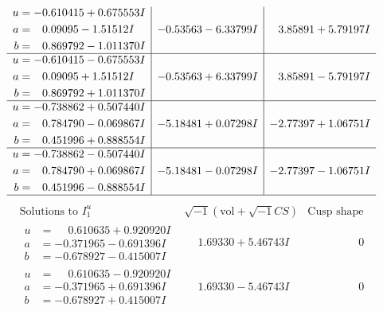 \documentclass[1p]{elsarticle_modified}
\theoremstyle{definition}
\newcommand{\I}{\sqrt{-1}}
\begin{document}
$$\begin{array}{c|c|c}
\begin{aligned}
u &= -0.610415 + 0.675553 I \\
a &= \phantom{-}0.09095 - 1.51512 I \\
b &= \phantom{-}0.869792 - 1.011370 I\end{aligned}
 & -0.53563 - 6.33799 I & \phantom{-}3.85891 + 5.79197 I \\ \hline\begin{aligned}
u &= -0.610415 - 0.675553 I \\
a &= \phantom{-}0.09095 + 1.51512 I \\
b &= \phantom{-}0.869792 + 1.011370 I\end{aligned}
 & -0.53563 + 6.33799 I & \phantom{-}3.85891 - 5.79197 I \\ \hline\begin{aligned}
u &= -0.738862 + 0.507440 I \\
a &= \phantom{-}0.784790 - 0.069867 I \\
b &= \phantom{-}0.451996 + 0.888554 I\end{aligned}
 & -5.18481 + 0.07298 I & -2.77397 + 1.06751 I \\ \hline\begin{aligned}
u &= -0.738862 - 0.507440 I \\
a &= \phantom{-}0.784790 + 0.069867 I \\
b &= \phantom{-}0.451996 - 0.888554 I\end{aligned}
 & -5.18481 - 0.07298 I & -2.77397 - 1.06751 I\\
 \hline 
 \end{array}$$\newpage$$\begin{array}{c|c|c}  
\text{Solutions to }I^u_{1}& \I (\text{vol} + \sqrt{-1}CS) & \text{Cusp shape}\\
 \hline 
\begin{aligned}
u &= \phantom{-}0.610635 + 0.920920 I \\
a &= -0.371965 - 0.691396 I \\
b &= -0.678927 - 0.415007 I\end{aligned}
 & \phantom{-}1.69330 + 5.46743 I & \phantom{-0.000000 } 0 \\ \hline\begin{aligned}
u &= \phantom{-}0.610635 - 0.920920 I \\
a &= -0.371965 + 0.691396 I \\
b &= -0.678927 + 0.415007 I\end{aligned}
 & \phantom{-}1.69330 - 5.46743 I & \phantom{-0.000000 } 0 \\ \hline\begin{aligned}

\end{aligned}
\end{array}$$
\end{document}
